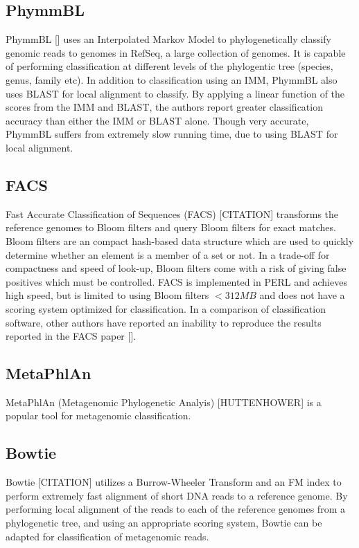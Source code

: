 \documentclass[12pt]{article} %
\begin{document}
\subsection{PhymmBL}
PhymmBL [\cite{Brady:2009dg}] uses an Interpolated Markov Model to phylogenetically classify genomic reads to genomes in RefSeq, a large collection of genomes. It is capable of performing classification at different levels of the phylogentic tree (species, genus, family etc). In addition to classification using an IMM, PhymmBL also uses BLAST for local alignment to classify. By applying a linear function of the scores from the IMM and BLAST, the authors report greater classification accuracy than either the IMM or BLAST alone. Though very accurate, PhymmBL suffers from extremely slow running time, due to using BLAST for local alignment. 

\subsection{FACS}
Fast Accurate Classification of Sequences (FACS) [CITATION] transforms the reference genomes to Bloom filters and query Bloom filters for exact matches. Bloom filters are an compact hash-based data structure which are used to quickly determine whether an element is a member of a set or not. In a trade-off for compactness and speed of look-up, Bloom filters come with a risk of giving false positives which must be controlled. FACS is implemented in PERL and achieves high speed, but is limited to using Bloom filters $<312 MB$ and does not have a scoring system optimized for classification. In a comparison of classification software, other authors have reported an inability to reproduce the results reported in the FACS paper [\cite{Bazinet:2012dg}].

\subsection{MetaPhlAn}
MetaPhlAn (Metagenomic Phylogenetic Analyis) [HUTTENHOWER] is a popular tool for metagenomic classification. 

\subsection{Bowtie}
Bowtie [CITATION] utilizes a Burrow-Wheeler Transform and an FM index to perform extremely fast alignment of short DNA reads to a reference genome. By performing local alignment of the reads to each of the reference genomes from a phylogenetic tree, and using an appropriate scoring system, Bowtie can be adapted for classification of metagenomic reads. 
\end{document}
